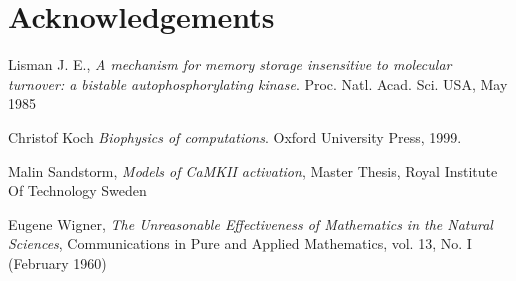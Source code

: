 \documentclass[]{resonance}
\begin{document}

\section*{Acknowledgements}

\begin{thebibliography}{99} 
    Lisman J. E., 
    \textit{A mechanism for memory storage insensitive to molecular turnover: a
    bistable autophosphorylating kinase}. 
    Proc. Natl. Acad. Sci. USA, May 1985

    Christof Koch
    \textit{Biophysics of computations}.
    Oxford University Press, 1999.

    Malin Sandstorm,
    \textit{Models of CaMKII activation},
    Master Thesis, Royal Institute Of Technology Sweden 

    Eugene Wigner,
    \textit{The Unreasonable Effectiveness of Mathematics in the Natural Sciences},
     Communications in Pure and Applied Mathematics, vol. 13, No. I (February 1960)

\end{thebibliography}
\end{document}
